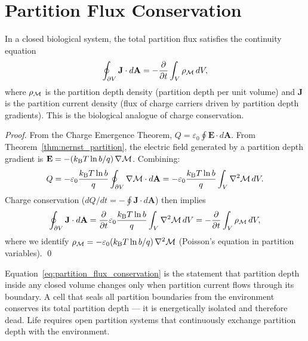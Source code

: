 \section{Partition Flux Conservation}
\label{sec:flux_conservation}

\begin{theorem}
\label{thm:flux_conservation}
In a closed biological system, the total partition flux satisfies the
continuity equation
\begin{equation}
  \oint_{\partial V} \mathbf{J} \cdot d\mathbf{A}
    = -\frac{\partial}{\partial t}\int_V \rho_{\mathcal{M}}\,dV,
  \label{eq:partition_flux_conservation}
\end{equation}
where $\rho_{\mathcal{M}}$ is the partition depth density (partition depth per
unit volume) and $\mathbf{J}$ is the partition current density (flux of
charge carriers driven by partition depth gradients).
This is the biological analogue of charge conservation.
\end{theorem}

\begin{proof}
From the Charge Emergence Theorem, $Q = \varepsilon_0\oint\mathbf{E}\cdot d\mathbf{A}$.
From Theorem~\ref{thm:nernst_partition}, the electric field generated by a
partition depth gradient is
$\mathbf{E} = -(k_{\mathrm{B}} T \ln b / q)\,\nabla\mathcal{M}$.
Combining:
\begin{equation}
  Q = -\varepsilon_0\frac{k_{\mathrm{B}} T \ln b}{q}
    \oint_{\partial V}\nabla\mathcal{M} \cdot d\mathbf{A}
    = -\varepsilon_0\frac{k_{\mathrm{B}} T \ln b}{q}
    \int_V\nabla^2\mathcal{M}\,dV.
\end{equation}
Charge conservation ($dQ/dt = -\oint\mathbf{J}\cdot d\mathbf{A}$) then implies
\begin{equation}
  \oint_{\partial V}\mathbf{J}\cdot d\mathbf{A}
    = \frac{\partial}{\partial t}\varepsilon_0\frac{k_{\mathrm{B}} T \ln b}{q}
    \int_V\nabla^2\mathcal{M}\,dV
    = -\frac{\partial}{\partial t}\int_V\rho_{\mathcal{M}}\,dV,
\end{equation}
where we identify $\rho_{\mathcal{M}} = -\varepsilon_0(k_{\mathrm{B}} T\ln b/q)\,\nabla^2\mathcal{M}$
(Poisson's equation in partition variables). \qed
\end{proof}

\begin{remark}
Equation~\eqref{eq:partition_flux_conservation} is the statement that partition
depth inside any closed volume changes only when partition current flows through
its boundary. A cell that seals all partition boundaries from the environment
conserves its total partition depth --- it is energetically isolated and
therefore dead. Life requires open partition systems that continuously exchange
partition depth with the environment.
\end{remark}


